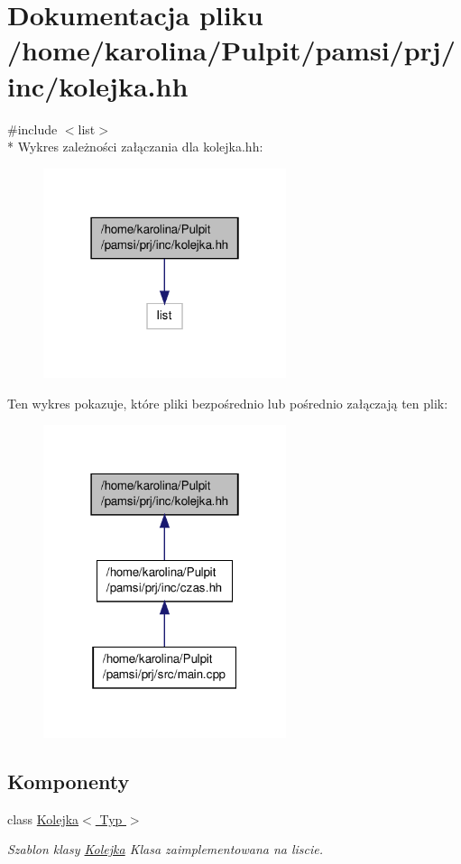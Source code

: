 \hypertarget{kolejka_8hh}{\section{Dokumentacja pliku /home/karolina/\-Pulpit/pamsi/prj/inc/kolejka.hh}
\label{kolejka_8hh}
}
{\ttfamily \#include $<$list$>$}\\*
Wykres zależności załączania dla kolejka.\-hh\-:\nopagebreak
\begin{figure}[H]
\begin{center}
\leavevmode
\includegraphics[width=202pt]{kolejka_8hh__incl}
\end{center}
\end{figure}
Ten wykres pokazuje, które pliki bezpośrednio lub pośrednio załączają ten plik\-:\nopagebreak
\begin{figure}[H]
\begin{center}
\leavevmode
\includegraphics[width=202pt]{kolejka_8hh__dep__incl}
\end{center}
\end{figure}
\subsection*{Komponenty}
\begin{DoxyCompactItemize}
\item 
class \hyperlink{class_kolejka}{Kolejka$<$ Typ $>$}
\begin{DoxyCompactList}\small\item\em Szablon klasy \hyperlink{class_kolejka}{Kolejka} Klasa zaimplementowana na liscie. \end{DoxyCompactList}\end{DoxyCompactItemize}
